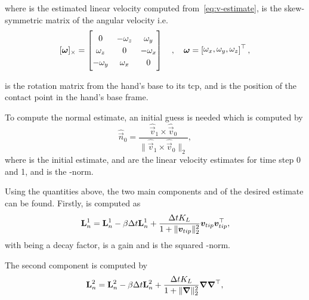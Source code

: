 where  is the estimated linear velocity computed from~\ref{eq:v-estimate},  is the skew-symmetric matrix of the angular velocity  i.e.
%
\begin{equation} \label{eq:skew-symmetric-matrix}
	[\bm{\omega}]_\times = 
	\begin{bmatrix}
		0 & -\omega_z & \omega_y \\ \omega_z & 0 & -\omega_x \\ -\omega_y & \omega_x & 0
	\end{bmatrix} \quad , \quad \bm{\omega} = \rvec{\omega_x, \omega_y, \omega_z}^\T,
\end{equation}

 is the rotation matrix from the hand's base to its \gls{tcp}, and  is the position of the contact point in the hand's base frame. \medskip

To compute the normal estimate, an initial guess is needed which is computed by
%
\begin{equation} \label{eq:def-n-init}
	\hat{\vec{n}}_{0} = \frac{\hat{\vec{v}}_{1} \times \hat{\vec{v}}_{0}}{\| \hat{\vec{v}}_{1} \times \hat{\vec{v}}_{0} \|_2},
\end{equation}
where  is the initial estimate,  and  are the linear velocity estimates for time step \num{0} and \num{1}, and  is the -norm. \medskip

Using the quantities above, the two main components  and  of the desired estimate  can be found. Firstly,  is computed as
%
\begin{equation} \label{eq:def-L-n-1}
	\bm{\mathrm{L}}_n^1 = \bm{\mathrm{L}}_n^1 - \beta \Delta t \bm{\mathrm{L}}_n^1 + \frac{\Delta t K_L}{1+\|\bm{v}_{tip}\|_2^2} \bm{v}_{tip} \bm{v}_{tip}^\top,
\end{equation}
with \mvar{\beta\inR{}} being a decay factor,  is a gain and  is the squared -norm. \medskip

The second component  is computed by
%
\begin{equation} \label{eq:def-L-2}
	\bm{\mathrm{L}}_n^2 = \bm{\mathrm{L}}_n^2 - \beta \Delta t \bm{\mathrm{L}}_n^2 + \frac{\Delta t K_L}{1+\|\bm{\nabla}\|_2^2} \bm{\nabla} \bm{\nabla}^\top,
\end{equation}

